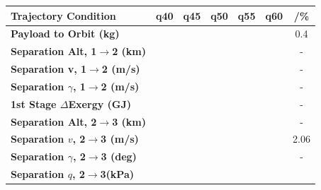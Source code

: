 \begin{table}[ht]
\centering
\begin{tabular}{l c c c c c c} 
	\hline \textbf{Trajectory Condition}
	&q40
	&q45
	&q50
	&q55
	&q60
	& /\%
	\\
	\hline \textbf{Payload to Orbit (kg)}
	& \PayloadToOrbitqForty
	& \PayloadToOrbitqFortyFive
	& \PayloadToOrbitqStandard
	& \PayloadToOrbitqFiftyFive
	& \PayloadToOrbitqSixty
	&0.4
	\\
	\textbf{Separation Alt, 1$\rightarrow$2 (km)}
	& \firstsecondSeparationAltqForty
	& \firstsecondSeparationAltqFortyFive
	& \firstsecondSeparationAltqStandard
	& \firstsecondSeparationAltqFiftyFive
	& \firstsecondSeparationAltqSixty
	& -
	\\
	\textbf{Separation v, 1$\rightarrow$2 (m/s)}
	& \firstsecondSeparationvqForty
	& \firstsecondSeparationvqFortyFive
	& \firstsecondSeparationvqStandard
	& \firstsecondSeparationvqFiftyFive
	& \firstsecondSeparationvqSixty
	& -
	\\
	\textbf{Separation $\gamma$, 1$\rightarrow$2 (m/s)}
	& \firstsecondSeparationgammaqForty
	& \firstsecondSeparationgammaqFortyFive
	& \firstsecondSeparationgammaqStandard
	& \firstsecondSeparationgammaqFiftyFive
	& \firstsecondSeparationgammaqSixty
	& -
	\\
	\textbf{1st Stage $\Delta$Exergy (GJ)}
	& \firstdExergyqForty
	& \firstdExergyqFortyFive
	& \firstdExergyqStandard
	& \firstdExergyqFiftyFive
	& \firstdExergyqSixty
	& -
	\\
	\textbf{Separation Alt, 2$\rightarrow$3 (km)}
	& \secondthirdSeparationAltqForty
	& \secondthirdSeparationAltqFortyFive
	& \secondthirdSeparationAltqStandard
	& \secondthirdSeparationAltqFiftyFive
	& \secondthirdSeparationAltqSixty
	& -
	\\
	\textbf{Separation $v$, 2$\rightarrow$3 (m/s)}
	& \secondthirdSeparationvqForty
	& \secondthirdSeparationvqFortyFive
	& \secondthirdSeparationvqStandard
	& \secondthirdSeparationvqFiftyFive
	& \secondthirdSeparationvqSixty
	&2.06
	\\
	\textbf{Separation $\gamma$, 2$\rightarrow$3 (deg)}
	& \secondthirdSeparationgammaqForty
	& \secondthirdSeparationgammaqFortyFive
	& \secondthirdSeparationgammaqStandard
	& \secondthirdSeparationgammaqFiftyFive
	& \secondthirdSeparationgammaqSixty
	& -
	\\
	\textbf{Separation $q$, 2$\rightarrow$3(kPa)}
	& \secondthirdSeparationqqForty
	& \secondthirdSeparationqqFortyFive
	& \secondthirdSeparationqqStandard
	& \secondthirdSeparationqqFiftyFive
	& \secondthirdSeparationqqSixty

\end{tabular}
\end{table}
